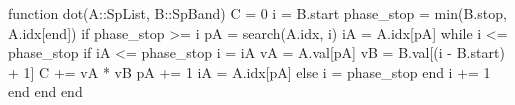 \begin{juliacode} 
function dot(A::SpList, B::SpBand)
  C = 0
  i = B.start
  phase_stop = min(B.stop, A.idx[end])
  if phase_stop >= i
    pA = search(A.idx, i)
    iA = A.idx[pA]
    while i <= phase_stop
      if iA <= phase_stop 
        i = iA
        vA = A.val[pA]
        vB = B.val[(i - B.start) + 1]
        C += vA * vB
        pA += 1
        iA = A.idx[pA]
      else
        i = phase_stop
      end
      i += 1
    end
  end
end
\end{juliacode}